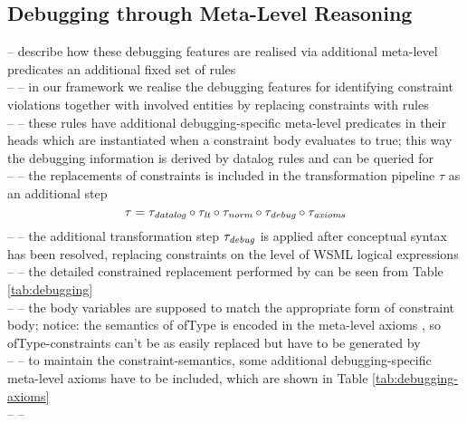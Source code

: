 \subsection{Debugging through Meta-Level Reasoning}
-- describe how these debugging features are realised via additional meta-level predicates an additional fixed set of rules \\
-- -- in our framework we realise the debugging features for identifying constraint violations together with involved entities by replacing constraints with rules \\
-- -- these rules have additional debugging-specific meta-level predicates in their heads which are instantiated when a constraint body evaluates to true; this way the debugging information is derived by datalog rules and can be queried for \\
-- -- the replacements of constraints is included in the transformation pipeline $\tau$ as an additional step \\
\begin{displaymath}
    \tau = \transdlog \circ \translt \circ \transnorm \circ \transdebug \circ \transax
\end{displaymath}
-- -- the additional transformation step $\transdebug$ is applied after conceptual syntax has been resolved, replacing constraints on the level of WSML logical expressions \\
-- -- the detailed constrained replacement performed by \transdebug can be seen from Table \ref{tab:debugging} \\
-- -- the body variables are supposed to match the appropriate form of constraint body; notice: the semantics of ofType is encoded in the meta-level axioms \mlaxioms, so ofType-constraints can't be as easily replaced but have to be generated by \transdebug \\
-- -- to maintain the constraint-semantics, some additional debugging-specific meta-level axioms have to be included, which are shown in Table \ref{tab:debugging-axioms} \\
-- --  \\

